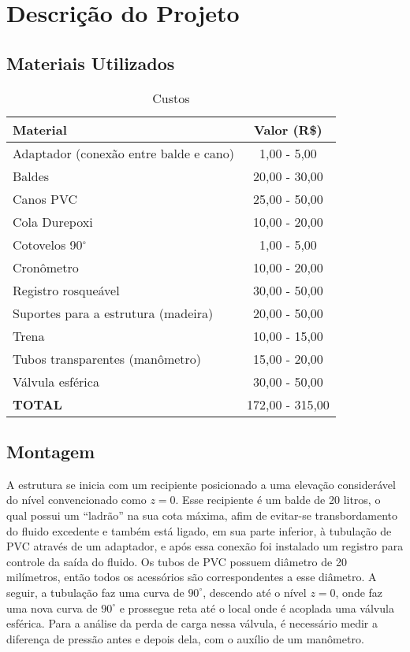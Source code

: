 \chapter{Descrição do Projeto}\label{descricao}

\section{Materiais Utilizados}

 \begin{table}[H]\label{t:custos}
     \centering
     \begin{tabular}{l c }
         \toprule
         \textbf{Material} & \textbf{Valor (R\$)} \\
         \midrule
         Adaptador (conexão entre balde e cano) & 1,00 - 5,00 \\
         Baldes & 20,00 - 30,00 \\
         Canos PVC & 25,00 - 50,00 \\
         Cola Durepoxi & 10,00 - 20,00 \\
         Cotovelos 90$^\circ$ & 1,00 - 5,00\\
         Cronômetro & 10,00 - 20,00 \\
         Registro rosqueável & 30,00 - 50,00 \\
         Suportes para a estrutura (madeira) & 20,00 - 50,00 \\
         Trena & 10,00 - 15,00 \\
         Tubos transparentes (manômetro) & 15,00 - 20,00 \\
         Válvula esférica & 30,00 - 50,00 \\
         \midrule
         \textbf{TOTAL} & 172,00 - 315,00\\
         \bottomrule
     \end{tabular}
     \caption{Custos}
 \end{table}

\section{Montagem}
\label{sec:montagem}

A estrutura se inicia com um recipiente posicionado a uma elevação 
considerável do nível convencionado como $z = 0$. Esse
recipiente é um balde de 20 litros, o qual possui um ``ladrão''
na sua cota máxima, afim de evitar-se transbordamento do fluido excedente e também
está ligado, em sua parte inferior, 
à tubulação de PVC através de um
adaptador, e após essa conexão foi instalado um registro para controle da 
saída do fluido. Os tubos de PVC possuem diâmetro de 20 milímetros, então todos
os acessórios são correspondentes a esse diâmetro. A seguir, a tubulação faz
uma curva de $90^\circ$, descendo até o nível $z = 0$, 
onde faz uma nova curva de $90^\circ$
e prossegue reta até o local onde é
acoplada uma válvula esférica. Para a análise da perda de carga nessa válvula, é
necessário medir a diferença de pressão antes e depois dela, com o auxílio de um
manômetro.

